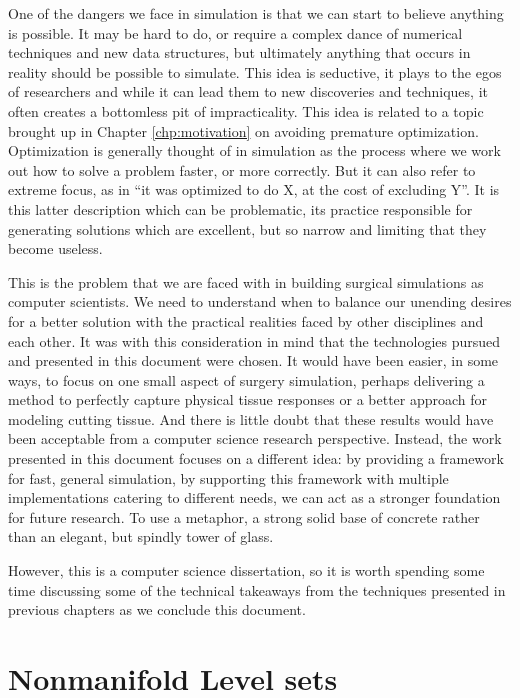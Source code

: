 One of the dangers we face in simulation is that we can start to
believe anything is possible. It may be hard to do, or require a
complex dance of numerical techniques and new data structures, but
ultimately anything that occurs in reality should be possible to
simulate. This idea is seductive, it plays to the egos of researchers
and while it can lead them to new discoveries and techniques, it often
creates a bottomless pit of impracticality. This idea is related to a
topic brought up in Chapter \ref{chp:motivation} on avoiding premature
optimization. Optimization is generally thought of in simulation as
the process where we work out how to solve a problem faster, or more
correctly. But it can also refer to extreme focus, as in ``it was
optimized to do X, at the cost of excluding Y''. It is this latter
description which can be problematic, its practice responsible for
generating solutions which are excellent, but so narrow and limiting
that they become useless.

This is the problem that we are faced with in building surgical
simulations as computer scientists. We need to understand when to
balance our unending desires for a better solution with the practical
realities faced by other disciplines and each other. It was with this
consideration in mind that the technologies pursued and presented in
this document were chosen. It would have been easier, in some ways, to
focus on one small aspect of surgery simulation, perhaps delivering a
method to perfectly capture physical tissue responses or a better
approach for modeling cutting tissue. And there is little doubt that
these results would have been acceptable from a computer science
research perspective. Instead, the work presented in this document
focuses on a different idea: by providing a framework for fast,
general simulation, by supporting this framework with multiple
implementations catering to different needs, we can act as a stronger
foundation for future research. To use a metaphor, a strong solid base
of concrete rather than an elegant, but spindly tower of glass.

However, this is a computer science dissertation, so it is worth
spending some time discussing some of the technical takeaways from the
techniques presented in previous chapters as we conclude this document.


\section{Nonmanifold Level sets}
\label{sec:discussion}


